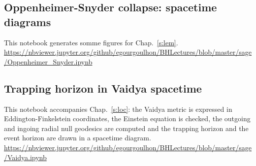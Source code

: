 \subsection{Oppenheimer-Snyder collapse: spacetime diagrams} \label{s:sam:Oppenheimer_Snyder}

This notebook generates somme figures for Chap.~\ref{s:lem}.\\[1ex]
{\footnotesize
\url{https://nbviewer.jupyter.org/github/egourgoulhon/BHLectures/blob/master/sage/Oppenheimer_Snyder.ipynb}
}


\subsection{Trapping horizon in Vaidya spacetime} \label{s:sam:Vaidya_trapping}

This notebook accompanies Chap.~\ref{s:loc}: the Vaidya metric is expressed in  Eddington-Finkelstein coordinates, the Einstein equation is checked, the outgoing and ingoing radial null geodesics are computed and the trapping horizon and the event
horizon are drawn in a spacetime diagram. \\[1ex]
{\footnotesize
\url{https://nbviewer.jupyter.org/github/egourgoulhon/BHLectures/blob/master/sage/Vaidya.ipynb}
}
